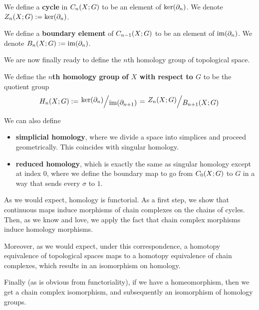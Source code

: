 \begin{boxdefinition}[Cycles]
    We define a \textbf{cycle} in $C_n\!\left( X; G \right)$ to be an element of $\operatorname{ker}\!\left( \partial_n \right)$. We denote $Z_n\!\left( X; G \right) := \operatorname{ker}\!\left( \partial_n \right)$.
\end{boxdefinition}

\begin{boxdefinition}
    We define a \textbf{boundary element} of $C_{n-1}\!\left( X; G \right)$ to be an element of $\operatorname{im}\!\left( \partial_n \right)$. We denote $B_n\!\left( X; G \right) := \operatorname{im}\!\left( \partial_n \right)$.
\end{boxdefinition}

We are now finally ready to define the $n$th homology group of topological space.

\begin{boxdefinition}
    We define the \textbf{$n$th homology group of $X$ with respect to $G$} to be the quotient group
    \begin{align*}
        H_n\of{X; G} := \quotient{\pker{\del_n}}{\pim{\del_{n+1}}} = \quotient{Z_n\of{X;G}}{B_{n+1}\of{X;G}}
    \end{align*}
\end{boxdefinition}


We can also define
\begin{itemize}
    \item \textbf{simplicial homology}, where we divide a space into simplices and proceed geometrically. This coincides with singular homology.
    \item \textbf{reduced homology}, which is exactly the same as singular homology except at index $0$, where we define the boundary map to go from $C_0\!\left( X; G \right)$ to $G$ in a way that sends every $\sigma$ to $1$.
\end{itemize}

As we would expect, homology is functorial. As a first step, we show that continuous maps induce morphisms of chain complexes on the chains of cycles. Then, as we know and love, we apply the fact that chain complex morphisms induce homology morphisms.

Moreover, as we would expect, under this correspondence, a homotopy equivalence of topological spaces maps to a homotopy equivalence of chain complexes, which results in an isomorphism on homology.

Finally (as is obvious from functoriality), if we have a homeomorphism, then we get a chain complex isomorphism, and subsequently an isomorphism of homology groups.